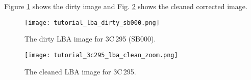 Figure \ref{fig:tutorial_lba_dirty} shows the dirty image and Fig. \ref{fig:tutorial_lba_cleaned} shows the cleaned corrected image. %



\begin{figure}[htp]
 \centering
\texttt{[image: tutorial\_lba\_dirty\_sb000.png]}
\caption{The dirty LBA image for 3C\,295 (SB000).}
\label{fig:tutorial_lba_dirty}
\end{figure}

\begin{figure}[htp]
 \centering
\texttt{[image: tutorial\_3c295\_lba\_clean\_zoom.png]}
\caption{The cleaned LBA image for 3C\,295.}
\label{fig:tutorial_lba_cleaned}
\end{figure}





